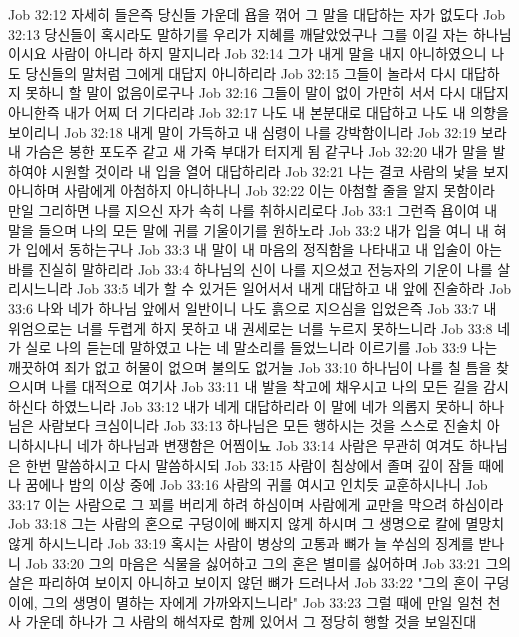 Job 32:12  자세히 들은즉 당신들 가운데 욥을 꺾어 그 말을 대답하는 자가 없도다
Job 32:13  당신들이 혹시라도 말하기를 우리가 지혜를 깨달았었구나 그를 이길 자는 하나님이시요 사람이 아니라 하지 말지니라
Job 32:14  그가 내게 말을 내지 아니하였으니 나도 당신들의 말처럼 그에게 대답지 아니하리라
Job 32:15  그들이 놀라서 다시 대답하지 못하니 할 말이 없음이로구나
Job 32:16  그들이 말이 없이 가만히 서서 다시 대답지 아니한즉 내가 어찌 더 기다리랴
Job 32:17  나도 내 본분대로 대답하고 나도 내 의향을 보이리니
Job 32:18  내게 말이 가득하고 내 심령이 나를 강박함이니라
Job 32:19  보라 내 가슴은 봉한 포도주 같고 새 가죽 부대가 터지게 됨 같구나
Job 32:20  내가 말을 발하여야 시원할 것이라 내 입을 열어 대답하리라
Job 32:21  나는 결코 사람의 낯을 보지 아니하며 사람에게 아첨하지 아니하나니
Job 32:22  이는 아첨할 줄을 알지 못함이라 만일 그리하면 나를 지으신 자가 속히 나를 취하시리로다
Job 33:1  그런즉 욥이여 내 말을 들으며 나의 모든 말에 귀를 기울이기를 원하노라
Job 33:2  내가 입을 여니 내 혀가 입에서 동하는구나
Job 33:3  내 말이 내 마음의 정직함을 나타내고 내 입술이 아는 바를 진실히 말하리라
Job 33:4  하나님의 신이 나를 지으셨고 전능자의 기운이 나를 살리시느니라
Job 33:5  네가 할 수 있거든 일어서서 내게 대답하고 내 앞에 진술하라
Job 33:6  나와 네가 하나님 앞에서 일반이니 나도 흙으로 지으심을 입었은즉
Job 33:7  내 위엄으로는 너를 두렵게 하지 못하고 내 권세로는 너를 누르지 못하느니라
Job 33:8  네가 실로 나의 듣는데 말하였고 나는 네 말소리를 들었느니라 이르기를
Job 33:9  나는 깨끗하여 죄가 없고 허물이 없으며 불의도 없거늘
Job 33:10  하나님이 나를 칠 틈을 찾으시며 나를 대적으로 여기사
Job 33:11  내 발을 착고에 채우시고 나의 모든 길을 감시하신다 하였느니라
Job 33:12  내가 네게 대답하리라 이 말에 네가 의롭지 못하니 하나님은 사람보다 크심이니라
Job 33:13  하나님은 모든 행하시는 것을 스스로 진술치 아니하시나니 네가 하나님과 변쟁함은 어찜이뇨
Job 33:14  사람은 무관히 여겨도 하나님은 한번 말씀하시고 다시 말씀하시되
Job 33:15  사람이 침상에서 졸며 깊이 잠들 때에나 꿈에나 밤의 이상 중에
Job 33:16  사람의 귀를 여시고 인치듯 교훈하시나니
Job 33:17  이는 사람으로 그 꾀를 버리게 하려 하심이며 사람에게 교만을 막으려 하심이라
Job 33:18  그는 사람의 혼으로 구덩이에 빠지지 않게 하시며 그 생명으로 칼에 멸망치 않게 하시느니라
Job 33:19  혹시는 사람이 병상의 고통과 뼈가 늘 쑤심의 징계를 받나니
Job 33:20  그의 마음은 식물을 싫어하고 그의 혼은 별미를 싫어하며
Job 33:21  그의 살은 파리하여 보이지 아니하고 보이지 않던 뼈가 드러나서
Job 33:22  "그의 혼이 구덩이에, 그의 생명이 멸하는 자에게 가까와지느니라"
Job 33:23  그럴 때에 만일 일천 천사 가운데 하나가 그 사람의 해석자로 함께 있어서 그 정당히 행할 것을 보일진대
